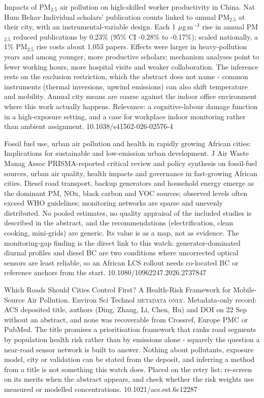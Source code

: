 \documentclass[10pt]{article}
\begin{document}

{Impacts of PM$_{2.5}$ air pollution on high-skilled worker productivity in China.}
{Nat Hum Behav}
{Individual scholars' publication counts linked to annual PM$_{2.5}$ at their city, with an instrumental-variable design. Each 1 $\mu$g\,m$^{-3}$ rise in annual PM$_{2.5}$ reduced publications by 0.23\% (95\% CI -0.28\% to -0.17\%); scaled nationally, a 1\% PM$_{2.5}$ rise costs about 1,053 papers. Effects were larger in heavy-pollution years and among younger, more productive scholars; mechanism analyses point to fewer working hours, more hospital visits and weaker collaboration. The inference rests on the exclusion restriction, which the abstract does not name - common instruments (thermal inversions, upwind emissions) can also shift temperature and mobility. Annual city means are coarse against the indoor office environment where this work actually happens. Relevance: a cognitive-labour damage function in a high-exposure setting, and a case for workplace indoor monitoring rather than ambient assignment.}
{10.1038/s41562-026-02576-4}

{Fossil fuel use, urban air pollution and health in rapidly growing African cities: Implications for sustainable and low-emission urban development.}
{J Air Waste Manag Assoc}
{PRISMA-reported critical review and policy synthesis on fossil-fuel sources, urban air quality, health impacts and governance in fast-growing African cities. Diesel road transport, backup generators and household energy emerge as the dominant PM, NOx, black carbon and VOC sources; observed levels often exceed WHO guidelines; monitoring networks are sparse and unevenly distributed. No pooled estimates, no quality appraisal of the included studies is described in the abstract, and the recommendations (electrification, clean cooking, mini-grids) are generic. Its value is as a map, not as evidence. The monitoring-gap finding is the direct link to this watch: generator-dominated diurnal profiles and diesel BC are two conditions where uncorrected optical sensors are least reliable, so an African LCS rollout needs co-located BC or reference anchors from the start.}
{10.1080/10962247.2026.2737847}

{Which Roads Should Cities Control First? A Health-Risk Framework for Mobile-Source Air Pollution.}
{Environ Sci Technol}
{\textsc{metadata only.} Metadata-only record: ACS deposited title, authors (Ding, Zhang, Li, Chen, Hu) and DOI on 22 Sep without an abstract, and none was recoverable from Crossref, Europe PMC or PubMed. The title promises a prioritisation framework that ranks road segments by population health risk rather than by emissions alone - squarely the question a near-road sensor network is built to answer. Nothing about pollutants, exposure model, city or validation can be stated from the deposit, and inferring a method from a title is not something this watch does. Placed on the retry list; re-screen on its merits when the abstract appears, and check whether the risk weights use measured or modelled concentrations.}
{10.1021/acs.est.6c12287}
\end{document}
